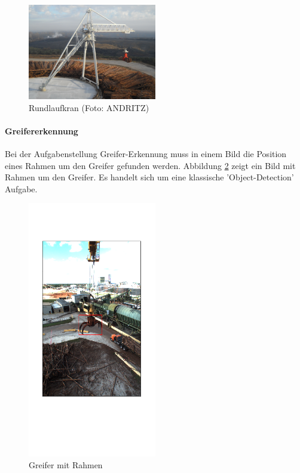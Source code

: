 	\begin{figure}[h]
		\centering
		\includegraphics[width=0.5\textwidth, center]{bilder/Grundlagen/Kran_vollstaendig_N1_030.jpg}
		\caption[Rund-Kran]{Rundlaufkran (Foto: ANDRITZ)}
		\label{img:CircularCrane}
	\end{figure}		

	\paragraph{Greifererkennung} Bei der Aufgabenstellung Greifer-Erkennung muss in einem Bild die Position eines Rahmen um den Greifer gefunden werden. Abbildung \ref{img:Grapple} zeigt ein Bild mit Rahmen um den Greifer. Es handelt sich um eine klassische 'Object-Detection' Aufgabe.
	\begin{figure}[h]
		\centering
		\includegraphics[width=0.5\textwidth, center]{bilder/Grundlagen/Grapple_8.png}
		\caption[Bsp. Bild: Greifer mit Rahmen]{Greifer mit Rahmen}
		\label{img:Grapple}
	\end{figure}
